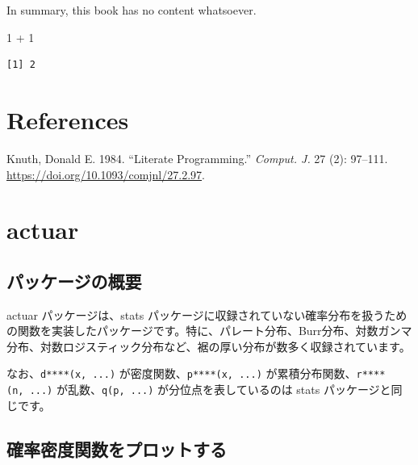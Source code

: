 \documentclass[
  letterpaper,
  DIV=11,
  numbers=noendperiod]{scrreprt}
\newenvironment{Shaded}{\begin{snugshade}}{\end{snugshade}}
\newcommand{\DecValTok}[1]{\textcolor[rgb]{0.68,0.00,0.00}{#1}}
\newcommand{\SpecialCharTok}[1]{\textcolor[rgb]{0.37,0.37,0.37}{#1}}
\newlength{\cslhangindent}
\newenvironment{CSLReferences}[2] %
 {\begin{list}{}{%
  \setlength{\itemindent}{0pt}
  \setlength{\leftmargin}{0pt}
  \setlength{\parsep}{0pt}
  \ifodd #1
   \setlength{\leftmargin}{\cslhangindent}
   \setlength{\itemindent}{-1\cslhangindent}
  \fi
  \setlength{\itemsep}{#2\baselineskip}}}
 {\end{list}}
\begin{document}
In summary, this book has no content whatsoever.

\begin{Shaded}
\begin{Highlighting}[]
\DecValTok{1} \SpecialCharTok{+} \DecValTok{1}
\end{Highlighting}
\end{Shaded}

\begin{verbatim}
[1] 2
\end{verbatim}


\chapter*{References}\label{references}


\label{refs}
\begin{CSLReferences}{1}{0}
Knuth, Donald E. 1984. {``Literate Programming.''} \emph{Comput. J.} 27
(2): 97--111. \url{https://doi.org/10.1093/comjnl/27.2.97}.

\end{CSLReferences}


\chapter{actuar}\label{actuar}

\section{パッケージの概要}\label{ux30d1ux30c3ux30b1ux30fcux30b8ux306eux6982ux8981}

actuar パッケージは、stats
パッケージに収録されていない確率分布を扱うための関数を実装したパッケージです。特に、パレート分布、Burr分布、対数ガンマ分布、対数ロジスティック分布など、裾の厚い分布が数多く収録されています。

なお、\texttt{d****(x,\ ...)} が密度関数、\texttt{p****(x,\ ...)}
が累積分布関数、\texttt{r****(n,\ ...)} が乱数、\texttt{q(p,\ ...)}
が分位点を表しているのは stats パッケージと同じです。

\section{確率密度関数をプロットする}\label{ux78baux7387ux5bc6ux5ea6ux95a2ux6570ux3092ux30d7ux30edux30c3ux30c8ux3059ux308b}
\end{document}
